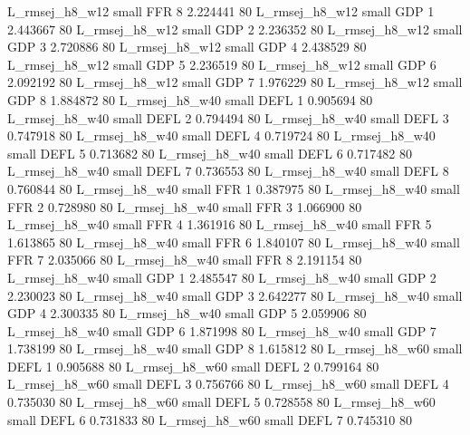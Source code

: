 L_rmsej_h8_w12      small      FFR                 8 2.224441 80
L_rmsej_h8_w12      small      GDP                 1 2.443667 80
L_rmsej_h8_w12      small      GDP                 2 2.236352 80
L_rmsej_h8_w12      small      GDP                 3 2.720886 80
L_rmsej_h8_w12      small      GDP                 4 2.438529 80
L_rmsej_h8_w12      small      GDP                 5 2.236519 80
L_rmsej_h8_w12      small      GDP                 6 2.092192 80
L_rmsej_h8_w12      small      GDP                 7 1.976229 80
L_rmsej_h8_w12      small      GDP                 8 1.884872 80
L_rmsej_h8_w40      small     DEFL                 1 0.905694 80
L_rmsej_h8_w40      small     DEFL                 2 0.794494 80
L_rmsej_h8_w40      small     DEFL                 3 0.747918 80
L_rmsej_h8_w40      small     DEFL                 4 0.719724 80
L_rmsej_h8_w40      small     DEFL                 5 0.713682 80
L_rmsej_h8_w40      small     DEFL                 6 0.717482 80
L_rmsej_h8_w40      small     DEFL                 7 0.736553 80
L_rmsej_h8_w40      small     DEFL                 8 0.760844 80
L_rmsej_h8_w40      small      FFR                 1 0.387975 80
L_rmsej_h8_w40      small      FFR                 2 0.728980 80
L_rmsej_h8_w40      small      FFR                 3 1.066900 80
L_rmsej_h8_w40      small      FFR                 4 1.361916 80
L_rmsej_h8_w40      small      FFR                 5 1.613865 80
L_rmsej_h8_w40      small      FFR                 6 1.840107 80
L_rmsej_h8_w40      small      FFR                 7 2.035066 80
L_rmsej_h8_w40      small      FFR                 8 2.191154 80
L_rmsej_h8_w40      small      GDP                 1 2.485547 80
L_rmsej_h8_w40      small      GDP                 2 2.230023 80
L_rmsej_h8_w40      small      GDP                 3 2.642277 80
L_rmsej_h8_w40      small      GDP                 4 2.300335 80
L_rmsej_h8_w40      small      GDP                 5 2.059906 80
L_rmsej_h8_w40      small      GDP                 6 1.871998 80
L_rmsej_h8_w40      small      GDP                 7 1.738199 80
L_rmsej_h8_w40      small      GDP                 8 1.615812 80
L_rmsej_h8_w60      small     DEFL                 1 0.905688 80
L_rmsej_h8_w60      small     DEFL                 2 0.799164 80
L_rmsej_h8_w60      small     DEFL                 3 0.756766 80
L_rmsej_h8_w60      small     DEFL                 4 0.735030 80
L_rmsej_h8_w60      small     DEFL                 5 0.728558 80
L_rmsej_h8_w60      small     DEFL                 6 0.731833 80
L_rmsej_h8_w60      small     DEFL                 7 0.745310 80
